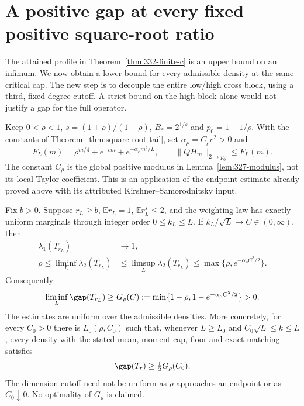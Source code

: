 \section{A positive gap at every fixed positive square-root ratio}
\label{sec:finite-c-positive}
The attained profile in Theorem~\ref{thm:332-finite-c} is an upper
bound on an infimum. We now obtain a lower bound for every admissible
density at the same critical cap. The new step is to decouple the entire
low/high cross block, using a third, fixed degree cutoff. A strict bound
on the high block alone would not justify a gap for the full operator.

Keep $0<\rho<1$, $s=(1+\rho)/(1-\rho)$, $B_*=2^{1/s}$ and
$p_0=1+1/\rho$. With the constants of
Theorem~\ref{thm:square-root-tail}, set $\alpha_\rho=C_\rho c^2>0$ and
\begin{equation}\label{eq:335-F}
 F_L(m)=\rho^{m/4}+e^{-cm}+e^{-\alpha_\rho m^2/L},
 \qquad \|QH_m\|_{2\to p_0}\le F_L(m).
\end{equation}
The constant $C_\rho$ is the global positive modulus in
Lemma~\ref{lem:327-modulus}, not its local Taylor coefficient.
This is an application of the endpoint estimate already proved above
with its attributed Kirshner--Samorodnitsky input.

\begin{theorem}
\label{thm:335-positive}
Fix $b>0$. Suppose $r_L\ge b$, $\mathbb E r_L=1$,
$\mathbb E r_L^s\le2$, and the weighting law has exactly uniform
marginals through integer order $0\le k_L\le L$. If
$k_L/\sqrt L\to C\in(0,\infty)$, then
\begin{align}
 \lambda_1(T_{r_L})&\longrightarrow1,\label{eq:335-first}\\
 \rho\le\liminf_L\lambda_2(T_{r_L})
 &\le\limsup_L\lambda_2(T_{r_L})
 \le\max\{\rho,e^{-\alpha_\rho C^2/2}\}.\label{eq:335-second}
\end{align}
Consequently
\begin{equation}\label{eq:335-lower-profile}
 \liminf_L\gap(T_{r_L})\ge G_\rho(C)
 :=\min\{1-\rho,1-e^{-\alpha_\rho C^2/2}\}>0.
\end{equation}
The estimates are uniform over the admissible densities. More concretely,
for every $C_0>0$ there is $L_0(\rho,C_0)$ such that, whenever
$L\ge L_0$ and $C_0\sqrt L\le k\le L$, every density with the stated
mean, moment cap, floor and exact matching satisfies
\begin{equation}\label{eq:335-finite-uniform}
 \gap(T_r)\ge\tfrac12G_\rho(C_0).
\end{equation}
The dimension cutoff need not be uniform as $\rho$ approaches an endpoint
or as $C_0\downarrow0$. No optimality of $G_\rho$ is claimed.
\end{theorem}

